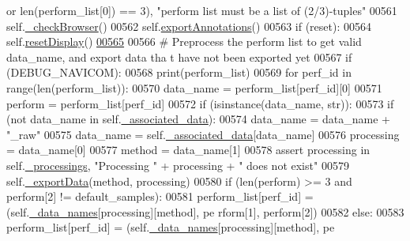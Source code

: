 \begin{DoxyCode}
      \textcolor{keywordflow}{or} len(perform\_list[0]) == 3), \textcolor{stringliteral}{"perform list must be a list of (2/3)-tuples"}
00561         self.\hyperlink{classnavicom_1_1navicom_1_1NaviCom_ab468a31a5f439bcae23f4c75b8c67f65}{_checkBrowser}()
00562         self.\hyperlink{classnavicom_1_1navicom_1_1NaviCom_a5a59edead26b5d02f17a60df055576f5}{exportAnnotations}()
00563         \textcolor{keywordflow}{if} (reset):
00564             self.\hyperlink{classnavicom_1_1navicom_1_1NaviCom_a379f15a87ba5c41c3501e9f386102c05}{resetDisplay}()
\hypertarget{navicom_8py_source_l00565}{}\hyperlink{classnavicom_1_1navicom_1_1NaviCom_ad7d4390d700d4a6d2533647887f8ab94}{00565} 
00566         \textcolor{comment}{# Preprocess the perform list to get valid data\_name, and export data tha
      t have not been exported yet}
00567         \textcolor{keywordflow}{if} (DEBUG\_NAVICOM):
00568             \textcolor{keywordflow}{print}(perform\_list)
00569         \textcolor{keywordflow}{for} perf\_id \textcolor{keywordflow}{in} range(len(perform\_list)):
00570             data\_name = perform\_list[perf\_id][0]
00571             perform = perform\_list[perf\_id]
00572             \textcolor{keywordflow}{if} (isinstance(data\_name, str)):
00573                 \textcolor{keywordflow}{if} (\textcolor{keywordflow}{not} data\_name \textcolor{keywordflow}{in} self.\hyperlink{classnavicom_1_1navicom_1_1NaviCom_a2e1d67aee497222ac3e508f6812d6a10}{_associated_data}):
00574                     data\_name = data\_name + \textcolor{stringliteral}{"\_raw"}
00575                 data\_name = self.\hyperlink{classnavicom_1_1navicom_1_1NaviCom_a2e1d67aee497222ac3e508f6812d6a10}{_associated_data}[data\_name]
00576             processing = data\_name[0]
00577             method = data\_name[1]
00578             \textcolor{keyword}{assert} processing \textcolor{keywordflow}{in} self.\hyperlink{classnavicom_1_1navicom_1_1NaviCom_ac6a14d6a91cd2f236eef71496a6f249c}{_processings}, \textcolor{stringliteral}{"Processing "} + processing + 
      \textcolor{stringliteral}{" does not exist"}
00579             self.\hyperlink{classnavicom_1_1navicom_1_1NaviCom_afb8ef6988c65589c35ad11dcb8681787}{_exportData}(method, processing)
00580             \textcolor{keywordflow}{if} (len(perform) >= 3 \textcolor{keywordflow}{and} perform[2] != default\_samples):
00581                 perform\_list[perf\_id] = (self.\hyperlink{classnavicom_1_1navicom_1_1NaviCom_ab8c34ab1a6d2a23f9b9ecee65375317a}{_data_names}[processing][method], pe
      rform[1], perform[2])
00582             \textcolor{keywordflow}{else}:
00583                 perform\_list[perf\_id] = (self.\hyperlink{classnavicom_1_1navicom_1_1NaviCom_ab8c34ab1a6d2a23f9b9ecee65375317a}{_data_names}[processing][method], pe

\end{DoxyCode}
